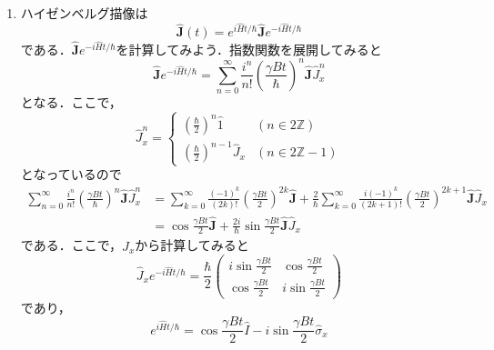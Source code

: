 \documentclass[a4paper,pdflatex,ja=standard]{bxjsarticle}
\begin{document}
\begin{enumerate}
  \item 
  ハイゼンベルグ描像は
  \begin{equation}
    \hat{\bm{J}}(t)
    =
    e^{i\hat{H}t/\hbar}
    \hat{\bm{J}}
    e^{-i\hat{H}t/\hbar}
  \end{equation}
  である．$\hat{\bm{J}}e^{-i\hat{H}t/\hbar}$を計算してみよう．指数関数を展開してみると
  \begin{equation}
    \hat{\bm{J}}e^{-i\hat{H}t/\hbar}
    =
    \sum_{n=0}^{\infty}
    \frac{i^{n}}{n!}
    \left( \frac{\gamma Bt}{\hbar} \right)^{n}
    \hat{\bm{J}}\hat{J}_{x}^{n}
  \end{equation}
  となる．ここで，
  \begin{equation}
    \hat{J}_{x}^{n}
    =
    \left\{
      \begin{alignedat}{1}
        \left( \frac{\hbar}{2} \right)^{n}\hat{1}
        \quad
        &
        (n\in 2\mathbb{Z})
        \\
        \left( \frac{\hbar}{2} \right)^{n-1}\hat{J}_{x}
        &
        (n\in 2\mathbb{Z}-1)
      \end{alignedat}
    \right.
  \end{equation}
  となっているので
  \begin{align}
    \sum_{n=0}^{\infty}
    \frac{i^{n}}{n!}
    \left( \frac{\gamma Bt}{\hbar} \right)^{n}
    \hat{\bm{J}}\hat{J}_{x}^{n}
    &=
    \sum_{k=0}^{\infty}
    \frac{(-1)^{k}}{(2k)!}
    \left( \frac{\gamma Bt}{2} \right)^{2k}
    \hat{\bm{J}}
    +
    \frac{2}{\hbar}
    \sum_{k=0}^{\infty}
    \frac{i(-1)^{k}}{(2k+1)!}
    \left( \frac{\gamma Bt}{2} \right)^{2k+1}
    \hat{\bm{J}}\hat{J}_{x}
    \nonumber
    \\
    &=
    \cos\frac{\gamma Bt}{2}
    \hat{\bm{J}}
    +
    \frac{2i}{\hbar}
    \sin\frac{\gamma Bt}{2}
    \hat{\bm{J}}\hat{J}_{x}
  \end{align}
  である．ここで，$\hat{J}_{x}$から計算してみると
  \begin{equation}
    \hat{J}_{x}
    e^{-i\hat{H}t/\hbar}
    =
    \frac{\hbar}{2}
    \begin{pmatrix}
      i\sin\frac{\gamma Bt}{2} & \cos\frac{\gamma Bt}{2} \\
      \cos\frac{\gamma Bt}{2} & i\sin\frac{\gamma Bt}{2}
    \end{pmatrix}
  \end{equation}
  であり，
  \begin{equation}
    e^{i\hat{H}t/\hbar}
    =
    \cos\frac{\gamma Bt}{2} \hat{I}
    -
    i\sin\frac{\gamma Bt}{2} \hat{\sigma}_{x}

\end{equation}
\end{enumerate}
\end{document}
